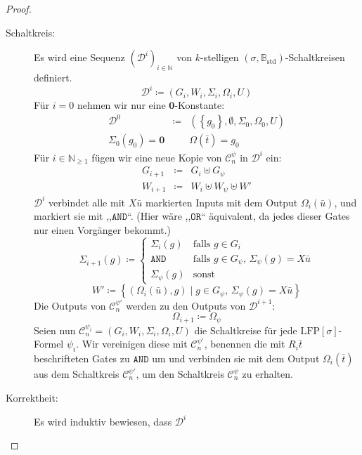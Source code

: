 \begin{proof}
\begin{casenv}
\begin{description}
\item [{Schaltkreis:}] Es wird eine Sequenz $\left(\mathcal{D}^{i}\right)_{i\in\mathbb{N}}$
von $k$-stelligen $\left(\sigma,\mathbb{B}_{\mathrm{std}}\right)$-Schaltkreisen
definiert.
\[
\mathcal{D}^{i}\coloneqq\left(G_{i},W_{i},\Sigma_{i},\Omega_{i},U\right)
\]
 Für $i=0$ nehmen wir nur eine $\mathbf{0}$-Konstante:
\begin{eqnarray*}
\mathcal{D}^{0} & \coloneqq & \left(\left\{ g_{0}\right\} ,\emptyset,\Sigma_{0},\Omega_{0},U\right)\\
\Sigma_{0}\left(g_{0}\right)=\mathbf{0} &  & \Omega\left(\bar{t}\right)=g_{0}
\end{eqnarray*}
Für $i\in\mathbb{N}_{\geqslant1}$ fügen wir eine neue Kopie von $\mathcal{C}_{n}^{\psi}$
in $\mathcal{D}^{i}$ ein:
\begin{eqnarray*}
G_{i+1} & \coloneqq & G_{i}\uplus G_{\psi}\\
W_{i+1} & \coloneqq & W_{i}\uplus W_{\psi}\uplus W'
\end{eqnarray*}
$\mathcal{D}^{i}$ verbindet alle mit $X\bar{u}$ markierten Inputs
mit dem Output $\Omega_{i}\left(\bar{u}\right)$, und markiert sie
mit ,,$\mathtt{AND}$``. (Hier wäre ,,$\mathtt{OR}$`` äquivalent,
da jedes dieser Gates nur einen Vorgänger bekommt.) 
\[
\Sigma_{i+1}\left(g\right)\coloneqq\begin{cases}
\Sigma_{i}\left(g\right) & \mathrm{falls}\,\,g\in G_{i}\\
\mathtt{AND} & \mathrm{falls}\,\,g\in G_{\psi},\,\Sigma_{\psi}\left(g\right)=X\bar{u}\\
\Sigma_{\psi}\left(g\right) & \mathrm{sonst}
\end{cases}
\]
\[
W'\coloneqq\left\{ \left(\Omega_{i}\left(\bar{u}\right),g\right)\mid g\in G_{\psi},\,\Sigma_{\psi}\left(g\right)=X\bar{u}\right\} 
\]
Die Outputs von $\mathcal{C}_{n}^{\psi'}$ werden zu den Outputs von
$\mathcal{D}^{i+1}$: 
\[
\Omega_{i+1}\coloneqq\Omega_{\psi}
\]
Seien nun $\mathcal{C}_{n}^{\psi_{i}}=\left(G_{i},W_{i},\Sigma_{i},\Omega_{i},U\right)$
die Schaltkreise für jede $\mathrm{LFP}\left[\sigma\right]$-Formel
$\psi_{i}$. Wir vereinigen diese mit $\mathcal{C}_{n}^{\psi'}$,
benennen die mit $R_{i}\bar{t}$ beschrifteten Gates zu $\mathtt{AND}$
um und verbinden sie mit dem Output $\Omega_{i}\left(\bar{t}\right)$
aus dem Schaltkreis $\mathcal{C}_{n}^{\psi'}$, um den Schaltkreis
$\mathcal{C}_{n}^{\psi}$ zu erhalten.
\item [{Korrektheit:}] Es wird induktiv bewiesen, dass $\mathcal{D}^{i}$

\end{description}
\end{casenv}
\end{proof}
